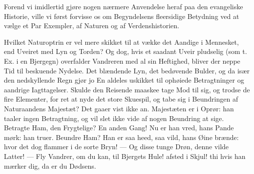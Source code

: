 \documentclass[12pt,a4paper]{book}
\begin{document}
Forend vi imidlertid gjøre nogen nærmere Anvendelse heraf paa den evangeliske
Historie, ville vi først forvisse os om Begyndelsens fleersidige Betydning ved at
vælge et Par Exempler, af Naturen og af Verdenshistorien.

Hvilket Naturoptrin er vel mere skikket til at vække det Aandige i Mennesket, end
Uveiret med Lyn og Torden? Og dog, hvis et saadant Uveir pludselig (som t. Ex. i
en Bjergegn) overfalder Vandreren med al sin Heftighed, bliver der neppe Tid til
beskuende Nydelse. Det blændende Lyn, det bedøvende Bulder, og da især den
nedskyllende Regn gjør jo En aldeles uskikket til ophøiede Betragtninger og
aandrige Iagttagelser. Skulde den Reisende maaskee tage Mod til sig, og trodse de
fire Elementer, for ret at nyde det store Skuespil, og tabe sig i Beundringen af
Naturaandens Majestæt? Det gaaer vist ikke an. Majestæten er i Oprør: han taaler
ingen Betragtning, og vil slet ikke vide af nogen Beundring at sige. Betragte
Ham, den Frygtelige? En anden Gang! Nu er han vred, hans Pande mørk: han truer.
Beundre Ham?
Han er saa heed, saa vild, hans Øine brænde: hvor det dog flammer i de sorte
Bryn! --- Og disse tunge Drøn, denne vilde Latter! ---
Fly Vandrer, om du kan, til Bjergets Hule! afsted i Skjul! thi hvis han mærker
dig, da er du Dødsens.
\end{document}
